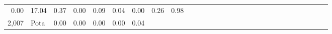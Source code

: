 \documentclass[]{article}
\begin{document}
\begin{longtable}[]{@{}rlrrrrrrrrrrrrrrrrrrrrrrrrrrr@{}}
\begin{minipage}[t]{0.02\columnwidth}
0.00\strut
\end{minipage} & \begin{minipage}[t]{0.01\columnwidth}\raggedleft\strut
17.04\strut
\end{minipage} & \begin{minipage}[t]{0.01\columnwidth}\raggedleft\strut
0.37\strut
\end{minipage} & \begin{minipage}[t]{0.01\columnwidth}\raggedleft\strut
0.00\strut
\end{minipage} & \begin{minipage}[t]{0.02\columnwidth}\raggedleft\strut
0.09\strut
\end{minipage} & \begin{minipage}[t]{0.01\columnwidth}\raggedleft\strut
0.04\strut
\end{minipage} & \begin{minipage}[t]{0.01\columnwidth}\raggedleft\strut
0.00\strut
\end{minipage} & \begin{minipage}[t]{0.01\columnwidth}\raggedleft\strut
0.26\strut
\end{minipage} & \begin{minipage}[t]{0.01\columnwidth}\raggedleft\strut
0.98\strut
\end{minipage}\tabularnewline
\begin{minipage}[t]{0.01\columnwidth}\raggedleft\strut
2,007\strut
\end{minipage} & \begin{minipage}[t]{0.02\columnwidth}\raggedright\strut
Pota\strut
\end{minipage} & \begin{minipage}[t]{0.01\columnwidth}\raggedleft\strut
0.00\strut
\end{minipage} & \begin{minipage}[t]{0.02\columnwidth}\raggedleft\strut
0.00\strut
\end{minipage} & \begin{minipage}[t]{0.02\columnwidth}\raggedleft\strut
0.00\strut
\end{minipage} & \begin{minipage}[t]{0.02\columnwidth}\raggedleft\strut
0.00\strut
\end{minipage} & \begin{minipage}[t]{0.01\columnwidth}\raggedleft\strut
0.04\strut
\end{minipage} & \begin{minipage}[t]{0.01\columnwidth}\raggedleft\strut

\end{minipage}
\end{longtable}
\end{document}
